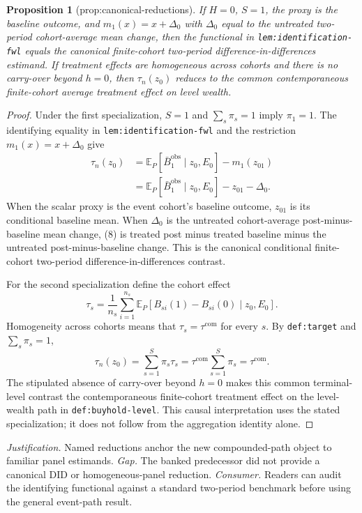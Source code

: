 \documentclass{article}
\newtheorem{proposition}{Proposition}
\begin{document}
\begin{proposition}[prop:canonical-reductions]\label{prop:canonical-reductions}
If \(H=0\), \(S=1\), the proxy is the baseline outcome, and \(m_1(x)=x+\Delta_0\) with \(\Delta_0\) equal to the untreated two-period cohort-average mean change, then the functional in \texttt{lem:identification-fwl} equals the canonical finite-cohort two-period difference-in-differences estimand. If treatment effects are homogeneous across cohorts and there is no carry-over beyond \(h=0\), then \(\tau_n(z_0)\) reduces to the common contemporaneous finite-cohort average treatment effect on level wealth.
\end{proposition}
\begin{proof}
Under the first specialization, \(S=1\) and \(\sum_s\pi_s=1\) imply
\(\pi_1=1\).  The identifying equality in
\texttt{lem:identification-fwl} and the restriction
\(m_1(x)=x+\Delta_0\) give
\[
\begin{aligned}
\tau_n(z_0)
&=\mathbb E_P[\bar B_1^{\mathrm{obs}}\mid z_0,E_0]-m_1(z_{01})\\
&=\mathbb E_P[\bar B_1^{\mathrm{obs}}\mid z_0,E_0]-z_{01}-\Delta_0.
\end{aligned}
\tag{8}
\]
When the scalar proxy is the event cohort's baseline outcome, \(z_{01}\) is
its conditional baseline mean.  When \(\Delta_0\) is the untreated
cohort-average post-minus-baseline mean change, (8) is treated post minus
treated baseline minus the untreated post-minus-baseline change.  This is the
canonical conditional finite-cohort two-period difference-in-differences
contrast.

For the second specialization define the cohort effect
\[
\tau_s=\frac1{n_s}\sum_{i=1}^{n_s}
\mathbb E_P[B_{si}(1)-B_{si}(0)\mid z_0,E_0].
\]
Homogeneity across cohorts means that \(\tau_s=\tau^{\mathrm{com}}\) for every
\(s\).  By \texttt{def:target} and \(\sum_s\pi_s=1\),
\[
\tau_n(z_0)=\sum_{s=1}^{S}\pi_s\tau_s
=\tau^{\mathrm{com}}\sum_{s=1}^{S}\pi_s
=\tau^{\mathrm{com}}.
\tag{9}
\]
The stipulated absence of carry-over beyond \(h=0\) makes this common
terminal-level contrast the contemporaneous finite-cohort treatment effect on
the level-wealth path in \texttt{def:buyhold-level}.  This causal
interpretation uses the stated specialization; it does not follow from the
aggregation identity alone.
\end{proof}
\par\smallskip\noindent \textit{Justification.} Named reductions anchor the new compounded-path object to familiar panel estimands. \textit{Gap.} The banked predecessor did not provide a canonical DID or homogeneous-panel reduction. \textit{Consumer.} Readers can audit the identifying functional against a standard two-period benchmark before using the general event-path result.
\end{document}
